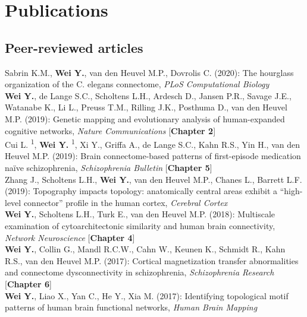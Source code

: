 \pagestyle{backmatter}

\chapter{Publications}
\label{publications}

\section*{Peer-reviewed articles}

Sabrin K.M., \textbf{Wei Y.}, van den Heuvel M.P., Dovrolis C. (2020): The hourglass organization of the C. elegans connectome, \textit{PLoS Computational Biology}\\

\noindent
\textbf{Wei Y.}, de Lange S.C., Scholtens L.H., Ardesch D., Jansen P.R., Savage J.E., Watanabe K., Li L., Preuss T.M., Rilling J.K., Posthuma D., van den Heuvel M.P. (2019): Genetic mapping and evolutionary analysis of human-expanded cognitive networks, \textit{Nature Communications} [\textbf{Chapter 2}]\\

\noindent
Cui L. \textsuperscript{1}, \textbf{Wei Y.} \textsuperscript{1}, Xi Y., Griffa A., de Lange S.C., Kahn R.S., Yin H., van den Heuvel M.P. (2019): Brain connectome-based patterns of first-episode medication naïve schizophrenia, \textit{Schizophrenia Bulletin} [\textbf{Chapter 5}]\\ 

\noindent
Zhang J., Scholtens L.H., \textbf{Wei Y.}, van den Heuvel M.P., Chanes L., Barrett L.F. (2019): Topography impacts topology: anatomically central areas exhibit a “high-level connector” profile in the human cortex, \textit{Cerebral Cortex}\\

\noindent
\textbf{Wei Y.}, Scholtens L.H., Turk E., van den Heuvel M.P. (2018): Multiscale examination of cytoarchitectonic similarity and human brain connectivity, \textit{Network Neuroscience} [\textbf{Chapter 4}]\\ 

\noindent
\textbf{Wei Y.}, Collin G., Mandl R.C.W., Cahn W., Keunen K., Schmidt R., Kahn R.S., van den Heuvel M.P. (2017): Cortical magnetization transfer abnormalities and connectome dysconnectivity in schizophrenia, \textit{Schizophrenia Research} [\textbf{Chapter 6}]\\ 

\noindent
\textbf{Wei Y.}, Liao X., Yan C., He Y., Xia M. (2017): Identifying topological motif patterns of human brain functional networks, \textit{Human Brain Mapping}\\ 


